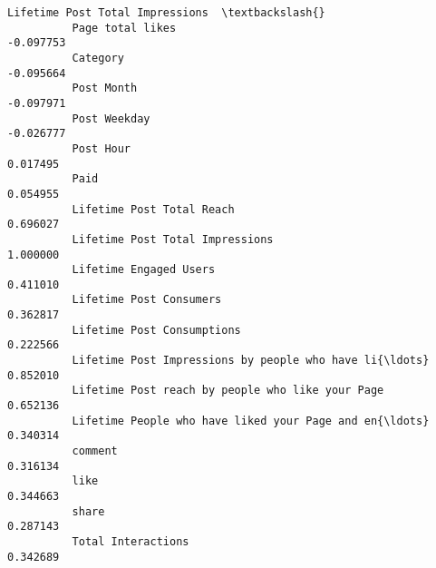 \documentclass[11pt]{article}
\begin{document}
\begin{Verbatim}[commandchars=\\\{\}]
                                                              Lifetime Post Total Impressions  \textbackslash{}
          Page total likes                                                          -0.097753   
          Category                                                                  -0.095664   
          Post Month                                                                -0.097971   
          Post Weekday                                                              -0.026777   
          Post Hour                                                                  0.017495   
          Paid                                                                       0.054955   
          Lifetime Post Total Reach                                                  0.696027   
          Lifetime Post Total Impressions                                            1.000000   
          Lifetime Engaged Users                                                     0.411010   
          Lifetime Post Consumers                                                    0.362817   
          Lifetime Post Consumptions                                                 0.222566   
          Lifetime Post Impressions by people who have li{\ldots}                         0.852010   
          Lifetime Post reach by people who like your Page                           0.652136   
          Lifetime People who have liked your Page and en{\ldots}                         0.340314   
          comment                                                                    0.316134   
          like                                                                       0.344663   
          share                                                                      0.287143   
          Total Interactions                                                         0.342689   
          

\end{Verbatim}
\end{document}
